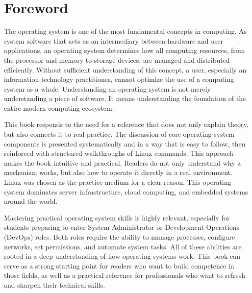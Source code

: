 
\chapter*{Foreword}

\noindent
The operating system is one of the most fundamental concepts in computing. As system software that acts as an intermediary between hardware and user applications, an operating system determines how all computing resources, from the processor and memory to storage devices, are managed and distributed efficiently. Without sufficient understanding of this concept, a user, especially an information technology practitioner, cannot optimize the use of a computing system as a whole. Understanding an operating system is not merely understanding a piece of software. It means understanding the foundation of the entire modern computing ecosystem.

\vspace{1cm}

\noindent
This book responds to the need for a reference that does not only explain theory, but also connects it to real practice. The discussion of core operating system components is presented systematically and in a way that is easy to follow, then reinforced with structured walkthroughs of Linux commands. This approach makes the book intuitive and practical. Readers do not only understand why a mechanism works, but also how to operate it directly in a real environment. Linux was chosen as the practice medium for a clear reason. This operating system dominates server infrastructure, cloud computing, and embedded systems around the world.

\vspace{1cm}

\noindent
Mastering practical operating system skills is highly relevant, especially for students preparing to enter System Administrator or Development Operations (DevOps) roles. Both roles require the ability to manage processes, configure networks, set permissions, and automate system tasks. All of these abilities are rooted in a deep understanding of how operating systems work. This book can serve as a strong starting point for readers who want to build competence in those fields, as well as a practical reference for professionals who want to refresh and sharpen their technical skills.

